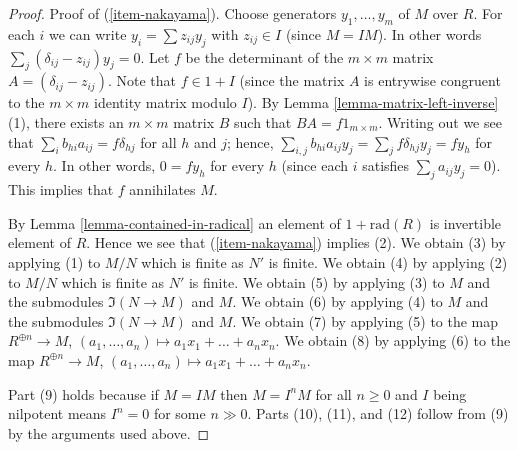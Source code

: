 \begin{proof}
Proof of (\ref{item-nakayama}). Choose generators $y_1, \ldots, y_m$ of $M$
over $R$. For each $i$ we can write $y_i = \sum z_{ij} y_j$ with
$z_{ij} \in I$ (since $M = IM$).
In other words $\sum_j (\delta_{ij} - z_{ij})y_j = 0$.
Let $f$ be the determinant of the $m \times m$ matrix
$A = (\delta_{ij} - z_{ij})$. Note that $f \in 1 + I$
(since the matrix $A$ is entrywise congruent to the
$m \times m$ identity matrix modulo $I$).
By Lemma \ref{lemma-matrix-left-inverse} (1),
there exists an $m \times m$
matrix $B$ such that $BA = f 1_{m \times m}$. Writing out we see that
$\sum_{i} b_{hi} a_{ij} = f \delta_{hj}$ for all
$h$ and $j$; hence, $\sum_{i, j} b_{hi} a_{ij} y_j
= \sum_{j} f \delta_{hj} y_j = f y_h$ for every $h$.
In other words, $0 = f y_h$ for every $h$ (since each
$i$ satisfies $\sum_j a_{ij} y_j = 0$).
This implies that $f$ annihilates $M$.

\medskip\noindent
By Lemma \ref{lemma-contained-in-radical} an element of $1 + \text{rad}(R)$ is
invertible element of $R$. Hence we see that (\ref{item-nakayama}) implies
(2). We obtain (3) by applying (1) to $M/N$ which is finite as $N'$ is finite.
We obtain (4) by applying (2) to $M/N$ which is finite as $N'$ is finite.
We obtain (5) by applying (3) to $M$ and the submodules $\Im(N \to M)$
and $M$. We obtain (6) by applying (4) to $M$ and the submodules
$\Im(N \to M)$ and $M$.
We obtain (7) by applying (5) to the map $R^{\oplus n} \to M$,
$(a_1, \ldots, a_n) \mapsto a_1x_1 + \ldots + a_nx_n$.
We obtain (8) by applying (6) to the map $R^{\oplus n} \to M$,
$(a_1, \ldots, a_n) \mapsto a_1x_1 + \ldots + a_nx_n$.

\medskip\noindent
Part (9) holds because if $M = IM$ then $M = I^nM$ for all $n \geq 0$
and $I$ being nilpotent means $I^n = 0$ for some $n \gg 0$. Parts
(10), (11), and (12) follow from (9) by the arguments used above.
\end{proof}
